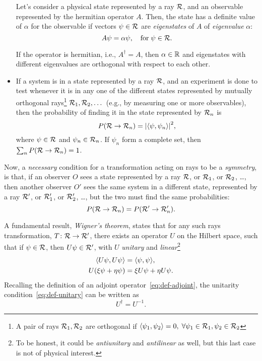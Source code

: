 \begin{itemize}
    Let's consider a physical state represented by a ray $\mathcal{R}$, and an observable represented by the hermitian operator $A$. Then, the state has a definite value of $\alpha$ for the observable if vectors $\psi \in \mathcal{R}$ are \emph{eigenstates} of $A$ of \emph{eigenvalue} $\alpha$:
    \begin{equation}
        A\psi = \alpha \psi, \quad \textup{for} \; \psi \in \mathcal{R} .
    \end{equation}

    If the operator is hermitian, i.e., $A^\dagger = A$, then $\alpha \in \mathbb{R}$ and eigenstates with different eigenvalues are orthogonal with respect to each other.
    \item If a system is in a state represented by a ray $\mathcal{R}$, and an experiment is done to test whenever it is in any one of the different states represented by mutually orthogonal rays\footnote{A pair of rays $\mathcal{R}_1, \mathcal{R}_2$ are orthogonal if $\langle \psi_1, \psi_2 \rangle = 0, \; \forall \psi_1 \in \mathcal{R}_1,  \psi_2 \in \mathcal{R}_2$} $\mathcal{R}_1, \mathcal{R}_2, \dots$ (e.g., by measuring one or more observables), then the probability of finding it in the state represented by $\mathcal{R}_n$ is 
    \begin{equation}
        P(\mathcal{R} \to \mathcal{R}_n) = \abs{\langle \psi, \psi_n \rangle}^2 ,
    \end{equation}
    where $\psi \in \mathcal{R}$ and $\psi_n \in \mathcal{R}_n$. If $\psi_n$ form a complete set, then $\sum_n P(\mathcal{R} \to \mathcal{R}_n) = 1$.
\end{itemize}

Now, a \emph{necessary} condition for a transformation acting on rays to be a \emph{symmetry}, is that, if an observer $O$ sees a state represented by a ray $\mathcal{R}$, or $\mathcal{R}_1$, or $\mathcal{R}_2$, \dots, then another observer $O'$ sees the same system in a different state, represented by a ray $\mathcal{R}'$, or $\mathcal{R}'_1$, or $\mathcal{R}'_2$, \dots, but the two must find the same probabilities:
\begin{equation}
    P(\mathcal{R} \to \mathcal{R}_n) = P(\mathcal{R}' \to \mathcal{R}'_n) .
\end{equation}

A fundamental result, \emph{Wigner's theorem}, states that for any such rays transformation, $T \colon \mathcal{R} \to \mathcal{R}'$, there exists an operator $U$ on the Hilbert space, such that if $\psi \in \mathcal{R}$, then $U\psi \in \mathcal{R}'$, with $U$ \emph{unitary} and \emph{linear}\footnote{To be honest, it could be \emph{antiunitary} and \emph{antilinear} as well, but this last case is not of physical interest.}
\begin{subequations}
\begin{align}
    \langle U\psi, U\psi \rangle &= \langle \psi, \psi \rangle \label{eq:def-unitary} ,\\ 
    U(\xi \psi + \eta \psi) &= \xi U \psi + \eta U \psi .
\end{align}
\end{subequations}
Recalling the definition of an adjoint operator~\eqref{eq:def-adjoint}, the unitarity condition~\eqref{eq:def-unitary} can be written as
\begin{equation}
    U^\dagger = U^{-1} .
\end{equation}

